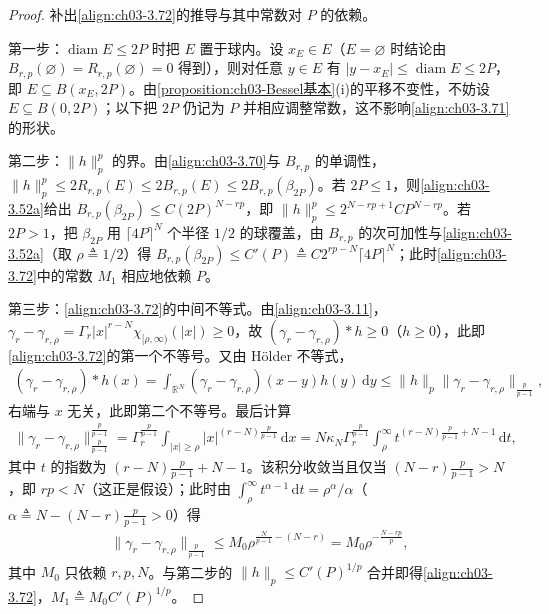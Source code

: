 \documentclass[../../main.tex]{subfiles}%
\begin{document}
\begin{proof}
补出\eqref{align:ch03-3.72}的推导与其中常数对 $P$ 的依赖。

第一步：$\operatorname{diam}E\leqslant2P$ 时把 $E$ 置于球内。设 $x_E\in E$（$E=\varnothing$ 时结论由 $B_{r,p}(\varnothing)=R_{r,p}(\varnothing)=0$ 得到），则对任意 $y\in E$ 有 $|y-x_E|\leqslant\operatorname{diam}E\leqslant2P$，即 $E\subseteq B(x_E,2P)$。由\cref{proposition:ch03-Bessel基本}(i)的平移不变性，不妨设 $E\subseteq B(0,2P)$；以下把 $2P$ 仍记为 $P$ 并相应调整常数，这不影响\eqref{align:ch03-3.71}的形状。

第二步：$\|h\|_p^p$ 的界。由\eqref{align:ch03-3.70}与 $B_{r,p}$ 的单调性，$\|h\|_p^p\leqslant2R_{r,p}(E)\leqslant2B_{r,p}(E)\leqslant2B_{r,p}(\beta_{2P})$。若 $2P\leqslant1$，则\eqref{align:ch03-3.52a}给出 $B_{r,p}(\beta_{2P})\leqslant C(2P)^{N-rp}$，即 $\|h\|_p^p\leqslant2^{N-rp+1}CP^{N-rp}$。若 $2P>1$，把 $\beta_{2P}$ 用 $\lceil4P\rceil^N$ 个半径 $1/2$ 的球覆盖，由 $B_{r,p}$ 的次可加性与\eqref{align:ch03-3.52a}（取 $\rho\triangleq1/2$）得 $B_{r,p}(\beta_{2P})\leqslant C'(P)\triangleq C2^{rp-N}\lceil4P\rceil^N$；此时\eqref{align:ch03-3.72}中的常数 $M_1$ 相应地依赖 $P$。

第三步：\eqref{align:ch03-3.72}的中间不等式。由\eqref{align:ch03-3.11}，$\gamma_r-\gamma_{r,\rho}=\Gamma_r|x|^{r-N}\chi_{[\rho,\infty)}(|x|)\geqslant0$，故 $(\gamma_r-\gamma_{r,\rho})*h\geqslant0$（$h\geqslant0$），此即\eqref{align:ch03-3.72}的第一个不等号。又由 Hölder 不等式，
\begin{align*}
(\gamma_r-\gamma_{r,\rho})*h(x)=\int_{\mathbb{R}^N}(\gamma_r-\gamma_{r,\rho})(x-y)h(y)\,\mathrm{d}y
\leqslant\|h\|_p\|\gamma_r-\gamma_{r,\rho}\|_{\frac{p}{p-1}},
\end{align*}
右端与 $x$ 无关，此即第二个不等号。最后计算
\begin{align*}
\|\gamma_r-\gamma_{r,\rho}\|_{\frac{p}{p-1}}^{\frac{p}{p-1}}
=\Gamma_r^{\frac{p}{p-1}}\int_{|x|\geqslant\rho}|x|^{(r-N)\frac{p}{p-1}}\,\mathrm{d}x
=N\kappa_N\Gamma_r^{\frac{p}{p-1}}\int_\rho^\infty t^{(r-N)\frac{p}{p-1}+N-1}\,\mathrm{d}t,
\end{align*}
其中 $t$ 的指数为 $(r-N)\frac{p}{p-1}+N-1$。该积分收敛当且仅当 $(N-r)\frac{p}{p-1}>N$，即 $rp<N$（这正是假设）；此时由 $\int_\rho^\infty t^{\alpha-1}\,\mathrm{d}t=\rho^{\alpha}/\alpha$（$\alpha\triangleq N-(N-r)\frac{p}{p-1}>0$）得
\begin{align*}
\|\gamma_r-\gamma_{r,\rho}\|_{\frac{p}{p-1}}\leqslant M_0\rho^{\frac{N}{p-1}-(N-r)}=M_0\rho^{-\frac{N-rp}{p}},
\end{align*}
其中 $M_0$ 只依赖 $r,p,N$。与第二步的 $\|h\|_p\leqslant C'(P)^{1/p}$ 合并即得\eqref{align:ch03-3.72}，$M_1\triangleq M_0C'(P)^{1/p}$。


\end{proof}
\end{document}
